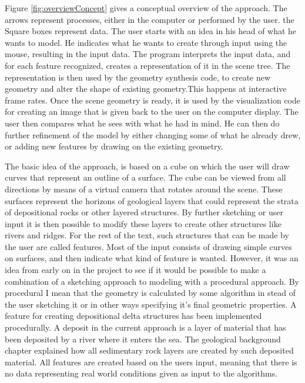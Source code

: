 \documentclass[a4paper,12pt]{report}
\begin{document}
Figure \ref{fig:overviewConcept} gives a conceptual overview of the approach. The arrows represent processes, either in the computer or performed by the user. the Square boxes represent data. The user starts with an idea in his head of what he wants to model. He indicates what he wants to create through input using the mouse, resulting in the input data. The program interprets the input data, and for each feature recognized, creates a representation of it in the scene tree. The representation is then used by the geometry synthesis code, to create new geometry and alter the shape of existing geometry.This happens at interactive frame rates. Once the scene geometry is ready, it is used by the visualization code for creating an image that is given back to the user on the computer display. The user then compares what he sees with what he had in mind. He can then do further refinement of the model by either changing some of what he already drew, or adding new features by drawing on the existing geometry.

The basic idea of the approach, is based on a cube on which the user will draw curves that represent an outline of a surface. The cube can be viewed from all directions by means of a virtual camera that rotates around the scene. These surfaces represent the horizons of geological layers that could represent the strata of depositional rocks or other layered structures. By further sketching or user input it is then possible to modify these layers to create other structures like rivers and ridges. For the rest of the text, such structures that can be made by the user are called features. Most of the input consists of drawing simple curves on surfaces, and then indicate what kind of feature is wanted. However, it was an idea from early on in the project to see if it would be possible to make a combination of a sketching approach to modeling with a procedural approach. By procedural I mean that the geometry is calculated by some algorithm in stead of the user sketching it or in other ways specifying it's final geometric properties. A feature for creating depositional delta structures has been implemented procedurally. A deposit in the current approach is a layer of material that has been deposited by a river where it enters the sea. The geological background chapter explained how all sedimentary rock layers are created by such deposited material. All features are created based on the users input, meaning that there is no data representing real world conditions given as input to the algorithms.
\end{document}
